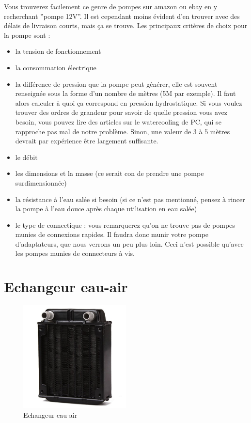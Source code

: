 \documentclass[a4paper, 11pt]{report}
\begin{document}
Vous trouverez facilement ce genre de pompes sur amazon ou ebay en
y recherchant ''pompe 12V''. Il est cependant moins évident d'en
trouver avec des délais de livraison courts, mais ça se trouve. Les
principaux critères de choix pour la pompe sont :
\begin{itemize}
\item la tension de fonctionnement
\item la consommation électrique
\item la différence de pression que la pompe peut générer, elle est souvent
renseignée sous la forme d'un nombre de mètres (5M par exemple). Il
faut alors calculer à quoi ça correspond en pression hydrostatique.
Si vous voulez trouver des ordres de grandeur pour savoir de quelle
pression vous avez besoin, vous pouvez lire des articles sur le watercooling
de PC, qui se rapproche pas mal de notre problème. Sinon, une valeur
de 3 à 5 mètres devrait par expérience être largement suffisante.
\item le débit
\item les dimensions et la masse (ce serait con de prendre une pompe surdimensionnée)
\item la résistance à l'eau salée si besoin (si ce n'est pas mentionné,
pensez à rincer la pompe à l'eau douce après chaque utilisation en
eau salée)
\item le type de connectique : vous remarquerez qu'on ne trouve pas de pompes
munies de connexions rapides. Il faudra donc munir votre pompe d'adaptateurs,
que nous verrons un peu plus loin. Ceci n'est possible qu'avec les
pompes munies de connecteurs à vis.
\end{itemize}

\section{Echangeur eau-air}

\begin{figure}[h]
\caption{Echangeur eau-air}

\centering{}\includegraphics[width=0.5\textwidth]{images/radiateur}
\end{figure}
\end{document}
